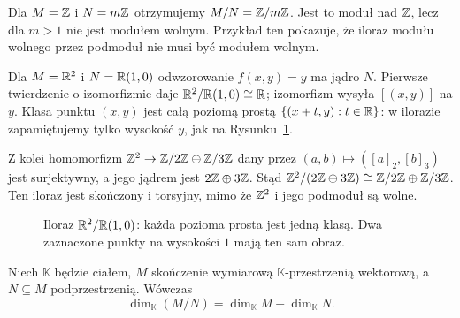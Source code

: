 \begin{przyklad}
Dla $M=\mathbb{Z}$ i $N=m\mathbb{Z}$ otrzymujemy $M/N=\mathbb{Z}/m\mathbb{Z}$.
Jest to moduł nad $\mathbb{Z}$, lecz dla $m>1$ nie jest modułem wolnym.
Przykład ten pokazuje, że iloraz modułu wolnego przez podmoduł
nie musi być modułem wolnym.

Dla $M=\mathbb{R}^2$ i $N=\mathbb{R}(1,0)$ odwzorowanie
$f(x,y)=y$ ma jądro $N$. Pierwsze twierdzenie
o izomorfizmie daje $\mathbb{R}^2/\mathbb{R}(1,0)\cong\mathbb{R}$;
izomorfizm wysyła $[(x,y)]$ na $y$.
Klasa punktu $(x,y)$ jest całą poziomą prostą
$\{(x+t,y):t\in\mathbb{R}\}$: w ilorazie zapamiętujemy tylko
wysokość $y$, jak na Rysunku~\ref{fig:modul-iloraz-poziome-5}.

Z kolei homomorfizm
$\mathbb{Z}^2\to\mathbb{Z}/2\mathbb{Z}\oplus\mathbb{Z}/3\mathbb{Z}$ dany przez
$(a,b)\mapsto([a]_2,[b]_3)$ jest surjektywny,
a jego jądrem jest $2\mathbb{Z}\oplus3\mathbb{Z}$. Stąd
$\mathbb{Z}^2/(2\mathbb{Z}\oplus3\mathbb{Z})\cong\mathbb{Z}/2\mathbb{Z}\oplus\mathbb{Z}/3\mathbb{Z}$.
Ten iloraz jest skończony i torsyjny, mimo że
$\mathbb{Z}^2$ i jego podmoduł są wolne.
\end{przyklad}

\begin{figure}[htbp]
\centering
{}
\caption{Iloraz $\mathbb{R}^2/\mathbb{R}(1,0)$: każda pozioma prosta
jest jedną klasą. Dwa zaznaczone punkty na wysokości $1$
mają ten sam obraz.}
\label{fig:modul-iloraz-poziome-5}
\end{figure}

\begin{stwierdzenie}
\label{prop:wymiar-ilorazu}
Niech $\mathbb K$ będzie ciałem, $M$ skończenie wymiarową
$\mathbb K$-przestrzenią wektorową, a $N\subseteq M$ podprzestrzenią.
Wówczas
\[
\dim_{\mathbb K}(M/N)
=
\dim_{\mathbb K}M-\dim_{\mathbb K}N.
\]
\end{stwierdzenie}

